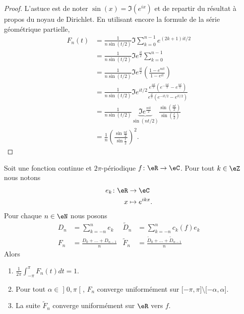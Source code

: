 \begin{proof}
    L'astuce est de noter \( \sin(x)=\Im( e^{ix})\) et de repartir du résultat à propos du noyau de Dirichlet. En utilisant encore la formule de la série géométrique partielle,
    \begin{subequations}
        \begin{align}
            F_n(t)&=\frac{1}{ n\sin(t/2) }\Im\sum_{k=0}^{n-1} e^{(2k+1)it/2}\\
            &=\frac{1}{ n\sin(t/2) }\Im e^{\frac{ it }{ 2 }}\sum_{k=0}^{n-1}\\
            &=\frac{1}{ n\sin(t/2) }\Im e^{\frac{ it }{ 2 }}\left( \frac{ 1- e^{nit} }{ 1- e^{it} } \right)\\
            &=\frac{1}{ n\sin(t/2) }\Im e^{it/2}\frac{  e^{\frac{ nit }{ 2 }}\left(  e^{-\frac{ int }{2}}- e^{\frac{ nit }{2}} \right) }{  e^{\frac{ it }{2}}\left(  e^{-it/2}- e^{it/2} \right) }\\
            &=\frac{1}{ n\sin(t/2) }\underbrace{\Im e^{\frac{ nit }{2}}}_{\sin(nt/2)}\frac{ \sin\left( \frac{ nt }{ 2 } \right) }{ \sin(\frac{ t }{2}) }\\
            &=\frac{1}{ n }\left( \frac{ \sin\frac{ nt }{2} }{ \sin\frac{ t }{2} } \right)^2.
        \end{align}
    \end{subequations}
\end{proof}


\begin{theorem}[Fejèr]
    Soit une fonction continue et \( 2\pi\)-périodique \( f\colon \eR\to \eC\). Pour tout \( k\in \eZ\) nous notons
    \begin{equation}
        \begin{aligned}
            e_k\colon \eR&\to \eC \\
            x&\mapsto  e^{ikx}. 
        \end{aligned}
    \end{equation}
    Pour chaque \( n\in \eN\) nous posons
    \begin{subequations}
        \begin{align}
            D_n&=\sum_{k=-n}^ne_k& \tilde D_n&=\sum_{k=-n}^nc_k(f)e_k\\
            F_n&=\frac{  D_0+\ldots + D_{n-1} }{ n }&  \tilde F_n&=\frac{ \tilde D_0+\ldots +\tilde D_{n-1} }{ n }
        \end{align}
    \end{subequations}
    Alors
    \begin{enumerate}
        \item
            $\frac{1}{ 2\pi }\int_{-\pi}^{\pi}F_n(t)dt=1$.
        \item
            Pour tout \( \alpha\in \mathopen] 0 , \pi \mathclose[\), \( F_n\) converge uniformément sur \( \mathopen[ -\pi , \pi \mathclose]\setminus\mathopen[ -\alpha , \alpha \mathclose]\).
        \item
            La suite \( \tilde F_n \) converge uniformément sur \( \eR\) vers \( f\).
    \end{enumerate}
\end{theorem}

